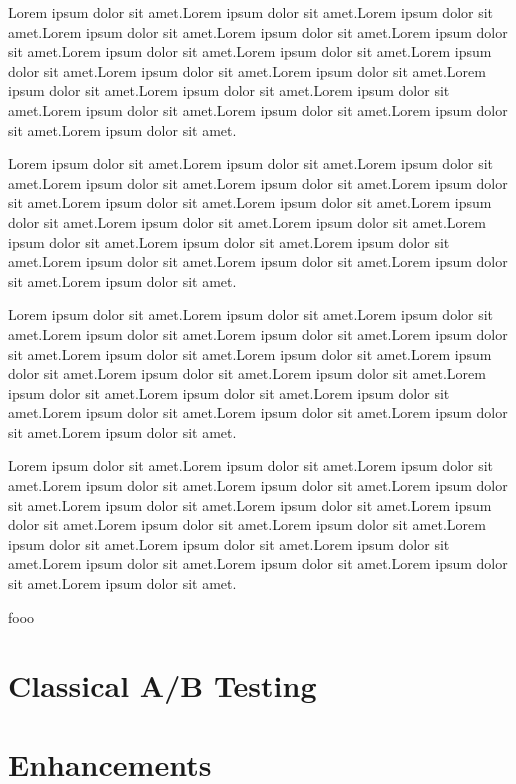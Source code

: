 \documentclass[main.tex]{subfiles}
\begin{document}
Lorem ipsum dolor sit amet.Lorem ipsum dolor sit amet.Lorem ipsum dolor sit amet.Lorem ipsum dolor sit amet.Lorem ipsum dolor sit amet.Lorem ipsum dolor sit amet.Lorem ipsum dolor sit amet.Lorem ipsum dolor sit amet.Lorem ipsum dolor sit amet.Lorem ipsum dolor sit amet.Lorem ipsum dolor sit amet.Lorem ipsum dolor sit amet.Lorem ipsum dolor sit amet.Lorem ipsum dolor sit amet.Lorem ipsum dolor sit amet.Lorem ipsum dolor sit amet.Lorem ipsum dolor sit amet.Lorem ipsum dolor sit amet.

Lorem ipsum dolor sit amet.Lorem ipsum dolor sit amet.Lorem ipsum dolor sit amet.Lorem ipsum dolor sit amet.Lorem ipsum dolor sit amet.Lorem ipsum dolor sit amet.Lorem ipsum dolor sit amet.Lorem ipsum dolor sit amet.Lorem ipsum dolor sit amet.Lorem ipsum dolor sit amet.Lorem ipsum dolor sit amet.Lorem ipsum dolor sit amet.Lorem ipsum dolor sit amet.Lorem ipsum dolor sit amet.Lorem ipsum dolor sit amet.Lorem ipsum dolor sit amet.Lorem ipsum dolor sit amet.Lorem ipsum dolor sit amet.

Lorem ipsum dolor sit amet.Lorem ipsum dolor sit amet.Lorem ipsum dolor sit amet.Lorem ipsum dolor sit amet.Lorem ipsum dolor sit amet.Lorem ipsum dolor sit amet.Lorem ipsum dolor sit amet.Lorem ipsum dolor sit amet.Lorem ipsum dolor sit amet.Lorem ipsum dolor sit amet.Lorem ipsum dolor sit amet.Lorem ipsum dolor sit amet.Lorem ipsum dolor sit amet.Lorem ipsum dolor sit amet.Lorem ipsum dolor sit amet.Lorem ipsum dolor sit amet.Lorem ipsum dolor sit amet.Lorem ipsum dolor sit amet.

Lorem ipsum dolor sit amet.Lorem ipsum dolor sit amet.Lorem ipsum dolor sit amet.Lorem ipsum dolor sit amet.Lorem ipsum dolor sit amet.Lorem ipsum dolor sit amet.Lorem ipsum dolor sit amet.Lorem ipsum dolor sit amet.Lorem ipsum dolor sit amet.Lorem ipsum dolor sit amet.Lorem ipsum dolor sit amet.Lorem ipsum dolor sit amet.Lorem ipsum dolor sit amet.Lorem ipsum dolor sit amet.Lorem ipsum dolor sit amet.Lorem ipsum dolor sit amet.Lorem ipsum dolor sit amet.Lorem ipsum dolor sit amet.

fooo

\section{Classical A/B Testing}
\section{Enhancements}
\end{document}
